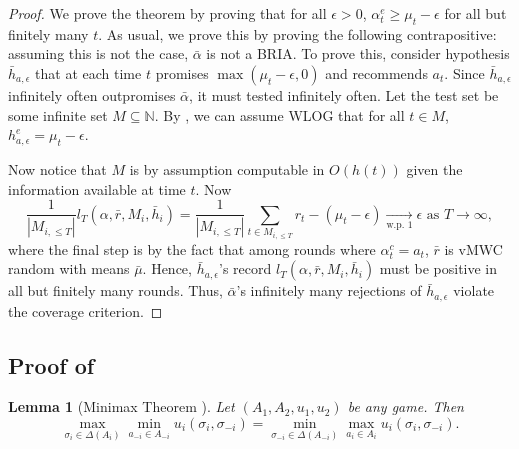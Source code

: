 \documentclass[submission,copyright,creativecommons]{eptcs}
\newtheorem{lemma}[theorem]{Lemma}
\begin{document}
\begin{proof}
We prove the theorem by proving that for all $\epsilon>0$, $\alpha_t^e\geq \mu_t-\epsilon$ for all but finitely many $t$. As usual, we prove this by proving the following contrapositive: assuming this is not the case, $\bar\alpha$ is not a BRIA. To prove this, consider hypothesis $\bar h_{a,\epsilon}$ that at each time $t$ promises $\max(\mu_t-\epsilon,0)$ and recommends $a_t$. Since $\bar h_{a,\epsilon}$ infinitely often outpromises $\bar \alpha$, it must tested infinitely often. Let the test set be some infinite set $M\subseteq \mathbb{N}$. By , we can assume WLOG that for all $t\in M$, $h_{a,\epsilon}^e=\mu_t-\epsilon$.

Now notice that $M$ is by assumption computable in $O(h(t))$ given the information available at time $t$. Now
\begin{equation*}
\frac{1}{|M_{i,\leq T}|} l_T(\alpha,\bar r,M_i,\bar h_i)= \frac{1}{|M_{i,\leq T}|} \sum_{t\in M_{i,\leq T}} r_t-(\mu_t-\epsilon) \underset{\text{w.p. }1}{\rightarrow} \epsilon \text{  as }T\rightarrow \infty,
\end{equation*}
where the final step is by the fact that among rounds where $\alpha_t^c=a_t$, $\bar r$ is vMWC random with means $\bar\mu$. Hence, $\bar h_{a,\epsilon}$'s record  $l_T(\alpha,\bar r,M_i,\bar h_i)$ must be positive in all but finitely many rounds. Thus, $\bar\alpha$'s infinitely many rejections of $\bar h_{a,\epsilon}$ violate the coverage criterion.
\end{proof}

\subsection{Proof of }
\label{appendix:proof-of-folk-theorem}

\begin{lemma}[Minimax Theorem \cite{v1928theorie}]
Let $(A_1,A_2,u_1,u_2)$ be any game. Then   
    \begin{equation*}
        \max_{\sigma_i\in\Delta(A_i)} \min_{a_{-i}\in A_{-i}} u_{i} (\sigma_i,\sigma_{-i}) = \min_{\sigma_{-i}\in \Delta(A_{-i})} \max_{a_i\in A_i} u_{i} (\sigma_i,\sigma_{-i}).
    \end{equation*}
\end{lemma}

%
%
%
%
%
%

%

\FolkTheorem*
\end{document}
